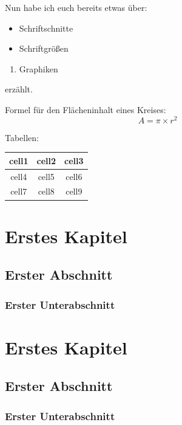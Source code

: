 \documentclass[twoside]{report}
\begin{document}
\vspace{1cm}



\vspace{1cm}


Nun habe ich euch bereits etwas über:
\begin{itemize}
    \item Schriftschnitte
    \item Schriftgrößen
\end{itemize}

\begin{enumerate}
    \item Graphiken
\end{enumerate}
erzählt.

\vspace{4cm}

Formel für den Flächeninhalt eines Kreises:
\[A=\pi×r^2\]

\vspace{1cm}


Tabellen:\\
\vspace{0.5cm}
\begin{tabular}{||c|c|c||}
\hline\hline
cell1 & cell2 & cell3\\
\hline
cell4 & cell5 & cell6\\
\hline
cell7 & cell8 & cell9\\
\hline\hline
\end{tabular}

\chapter{Erstes Kapitel}
\section{Erster Abschnitt}
\subsection{Erster Unterabschnitt}

\color{blue}

\chapter*{Erstes Kapitel}
\section*{Erster Abschnitt}
\subsection*{Erster Unterabschnitt}
\end{document}
